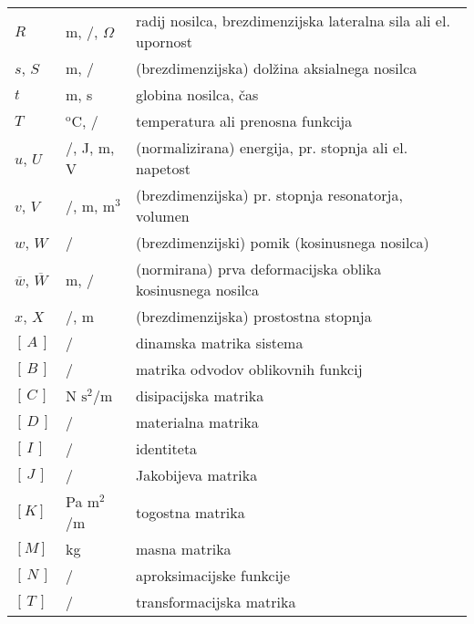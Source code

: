 \begin{longtable}[l]{@{}p{}@{}p{}@{}p{}@{}}
    $R$     & m, /,  $\Omega$           & radij nosilca, brezdimenzijska  lateralna sila ali el. upornost\\
    $s$, $S$ & m, / & (brezdimenzijska) dolžina aksialnega nosilca \\
    $t$     & m, s                  & globina nosilca, čas \\
    $T$ & $^\text{o}$C, / & temperatura ali prenosna funkcija \\ 
    $u$, $U$ & /, J, m, V & (normalizirana) energija, pr. stopnja ali el. napetost \\
    $v$, $V$ & /, m, m$^3$ & (brezdimenzijska) pr. stopnja resonatorja, volumen \\
    $w$, $W$ & / & (brezdimenzijski) pomik (kosinusnega nosilca)\\
    $\overline{w}$, $\overline{W}$ & m, / & (normirana) prva deformacijska oblika kosinusnega nosilca\\
    $x$, $X$ & /, m & (brezdimenzijska) prostostna stopnja \\

    \hline
    $[\,A\,]$   & /& dinamska matrika sistema \\
    $[\,B\,]$   & / & matrika odvodov oblikovnih funkcij \\
    $[\,C\,]$       & N $\text{s}^2$/m & disipacijska matrika\\
    $[\,D\,]$   & / & materialna matrika \\
    $[\,I\,]$   & /& identiteta \\
    $[\,J\,]$   & /& Jakobijeva matrika \\
    $[K]$       & Pa $\text{m}^2$/m & togostna matrika\\
    $[M]$       & kg & masna matrika\\
    $[\,N\,]$   & / & aproksimacijske funkcije \\
    $[\,T\,]$   &/ & transformacijska matrika \\
    


\end{longtable}
